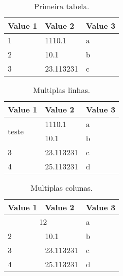\documentclass{article}
\begin{document}
\begin{appendix}
	\listoftables
	\newpage
\end{appendix}

\begin{table}[h!]
	\begin{center}
		\begin{tabular}{l|l|l}
			\textbf{Value 1} & \textbf{Value 2} & \textbf{Value 3} \\
			\hline
			1                & 1110.1           & a                \\
			2                & 10.1             & b                \\
			3                & 23.113231        & c                \\
		\end{tabular}
		\caption{Primeira tabela.}
		\label{tab:table1}
	\end{center}
\end{table}

\newpage

\begin{table}[h!]
	\begin{center}
		\begin{tabular}{l|l|l}
			\textbf{Value 1}       & \textbf{Value 2} & \textbf{Value 3} \\
			\hline
			\multirow{2}{*}{teste} & 1110.1           & a                \\ %
			                       & 10.1             & b                \\ %
			\hline
			3                      & 23.113231        & c                \\
			4                      & 25.113231        & d                \\
		\end{tabular}
		\caption{Multiplas linhas.}
		\label{tab:table1}
	\end{center}
\end{table}

\newpage

\begin{table}[h!]
	\begin{center}
		\begin{tabular}{l|l|l}
			\textbf{Value 1} & \textbf{Value 2} & \textbf{Value 3} \\
			\hline
			\multicolumn{2}{c|}{12} & a\\ 
			\hline
			2                & 10.1             & b                \\
			3                & 23.113231        & c                \\
			4                & 25.113231        & d                \\
		\end{tabular}
		\caption{Multiplas colunas.}
		\label{tab:table1}
	\end{center}
\end{table}
\end{document}
